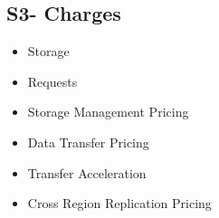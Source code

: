 \documentclass{article}
\begin{document}
	\subsection{S3- Charges}
	\begin{itemize}
	\item
	Storage
	
	\item
	Requests
	
	\item
	Storage Management Pricing
	
	\item
	Data Transfer Pricing
	
	\item
	Transfer Acceleration
	
	\item
	Cross Region Replication Pricing
	\end{itemize}		
\end{document}
